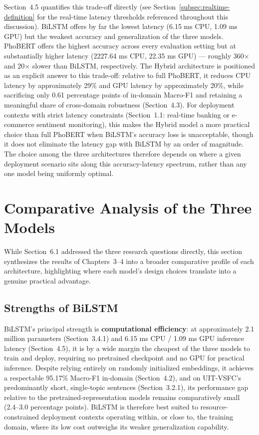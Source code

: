\documentclass[12pt]{report} %
\begin{document}
Section~4.5 quantifies this trade-off directly (see Section~\ref{subsec:realtime-definition} for the real-time latency thresholds referenced throughout this discussion). BiLSTM offers by far the lowest latency (6.15 ms CPU, 1.09 ms GPU) but the weakest accuracy and generalization of the three models. PhoBERT offers the highest accuracy across every evaluation setting but at substantially higher latency (2227.64 ms CPU, 22.35 ms GPU) --- roughly 360$\times$ and 20$\times$ slower than BiLSTM, respectively. The Hybrid architecture is positioned as an explicit answer to this trade-off: relative to full PhoBERT, it reduces CPU latency by approximately 29\% and GPU latency by approximately 20\%, while sacrificing only 0.61 percentage points of in-domain Macro-F1 and retaining a meaningful share of cross-domain robustness (Section~4.3). For deployment contexts with strict latency constraints (Section~1.1: real-time banking or e-commerce sentiment monitoring), this makes the Hybrid model a more practical choice than full PhoBERT when BiLSTM's accuracy loss is unacceptable, though it does not eliminate the latency gap with BiLSTM by an order of magnitude. The choice among the three architectures therefore depends on where a given deployment scenario sits along this accuracy-latency spectrum, rather than any one model being uniformly optimal.

\section{Comparative Analysis of the Three Models}

While Section~6.1 addressed the three research questions directly, this section synthesizes the results of Chapters~3--4 into a broader comparative profile of each architecture, highlighting where each model's design choices translate into a genuine practical advantage.

\subsection{Strengths of BiLSTM}
BiLSTM's principal strength is \textbf{computational efficiency}: at approximately 2.1 million parameters (Section~3.4.1) and 6.15 ms CPU / 1.09 ms GPU inference latency (Section~4.5), it is by a wide margin the cheapest of the three models to train and deploy, requiring no pretrained checkpoint and no GPU for practical inference. Despite relying entirely on randomly initialized embeddings, it achieves a respectable 95.17\% Macro-F1 in-domain (Section~4.2), and on UIT-VSFC's predominantly short, single-topic sentences (Section~3.2.1), its performance gap relative to the pretrained-representation models remains comparatively small (2.4--3.0 percentage points). BiLSTM is therefore best suited to resource-constrained deployment contexts operating within, or close to, the training domain, where its low cost outweighs its weaker generalization capability.
\end{document}
